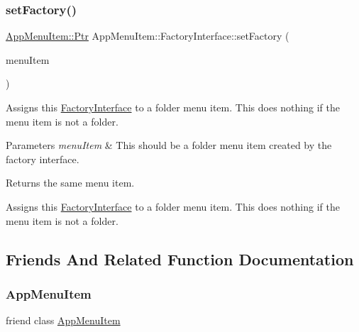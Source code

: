 \subsubsection{\texorpdfstring{set\+Factory()}{setFactory()}}
{\footnotesize\ttfamily \mbox{\hyperlink{classAppMenuItem_ab5f51c5d74f8df62b8862c0cc8126cb7}{App\+Menu\+Item\+::\+Ptr}} App\+Menu\+Item\+::\+Factory\+Interface\+::set\+Factory (\begin{DoxyParamCaption}\item[{\mbox{\hyperlink{classAppMenuItem_ab5f51c5d74f8df62b8862c0cc8126cb7}{App\+Menu\+Item\+::\+Ptr}}}]{menu\+Item }\end{DoxyParamCaption})\hspace{0.3cm}{\ttfamily [protected]}}

Assigns this \mbox{\hyperlink{classAppMenuItem_1_1FactoryInterface}{Factory\+Interface}} to a folder menu item. This does nothing if the menu item is not a folder.


\begin{DoxyParams}{Parameters}
{\em menu\+Item} & This should be a folder menu item created by the factory interface.\\
\hline
\end{DoxyParams}
\begin{DoxyReturn}{Returns}
the same menu item.
\end{DoxyReturn}
Assigns this \mbox{\hyperlink{classAppMenuItem_1_1FactoryInterface}{Factory\+Interface}} to a folder menu item. This does nothing if the menu item is not a folder. 

\subsection{Friends And Related Function Documentation}
\mbox{\label{classAppMenuItem_1_1FactoryInterface_a233b0ef6cd217f2565958dde9ae00802}} 
\subsubsection{\texorpdfstring{App\+Menu\+Item}{AppMenuItem}}
{\footnotesize\ttfamily friend class \mbox{\hyperlink{classAppMenuItem}{App\+Menu\+Item}}\hspace{0.3cm}{\ttfamily [friend]}}



